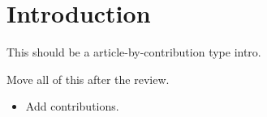 \section{Introduction}

This should be a article-by-contribution type intro.

Move all of this after the review.

\begin{itemize}
    \item Add contributions.
\end{itemize}


